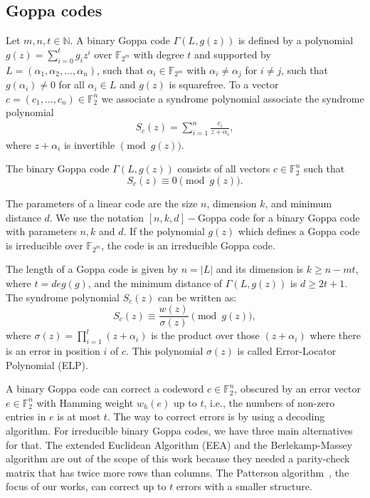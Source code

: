 \subsection{Goppa codes}
Let $m, n, t\in \mathbb{N}$. A binary Goppa code $\Gamma(L, g(z))$ is defined by a polynomial $g(z) = \sum_{i=0}^{t}g_iz^i$ over $\mathbb{F}_{2^m}$ with degree $t$ and supported by $L = (\alpha_1, \alpha_2, \dots, \alpha_n)$, such that $\alpha_i \in \mathbb{F}_{2^m}$ with $\alpha_i \neq \alpha_j$ for $i\neq j$, such that $g(\alpha_i) \neq 0$ for all $\alpha_i \in L$ and $g(z)$ is squarefree. To a vector  $c = (c_1, \ldots, c_{n}) \in \mathbb{F}^n_{2}$ we associate a syndrome polynomial associate the syndrome polynomial
\begin{align}
  S_c(z) = \sum_{i=1}^{n} \frac{c_i}{z+\alpha_i},  
\end{align}
where ${z+\alpha_i}$ is invertible $\pmod{g(z)}$.
\begin{definition}
The binary Goppa code $\Gamma(L, g(z))$ consists of all vectors $c \in \mathbb{F}_{2}^n$ such that
\begin{equation}
    S_c(z) \equiv 0 \pmod{g(z)}.
\end{equation}
\end{definition}

The parameters of a linear code are the size $n$, dimension $k$, and minimum distance $d$. We use the notation $[n,k,d]-$Goppa code for a binary Goppa code with parameters $n,k$ and $d$. If the polynomial $g(z)$ which defines a Goppa code is irreducible over $\mathbb{F}_{2^m}$, the code is an irreducible Goppa code.

The length of a Goppa code is given by $n = |L|$ and its dimension is $k \geq n-mt$, where $t = deg(g)$, and the minimum distance of $\Gamma(L, g(z))$ is $d \geq 2t + 1$. The syndrome polynomial $S_c(z)$ can be written as:
\begin{equation}
    S_c(z) \equiv \frac{w(z)}{\sigma(z)} \pmod{g(z)},
\end{equation}
where $\sigma(z) = {\displaystyle \prod_{i=1}^{l}(z+\alpha_i)}$ is the product over those $(z+\alpha_i)$ where there is an error in position $i$ of $c$. This polynomial $\sigma(z)$ is called Error-Locator Polynomial (ELP).

A binary Goppa code can correct a codeword $c \in \mathbb{F}_{2}^n$, obscured by an error vector $e \in \mathbb{F}_{2}^n$ with Hamming weight $w_h(e)$ up to $t$, i.e., the numbers of non-zero entries in $e$ is at most $t$. The way to correct errors is by using a decoding algorithm. For irreducible binary Goppa codes, we have three main alternatives for that. The extended Euclidean Algorithm (EEA) and the Berlekamp-Massey algorithm are out of the scope of this work because they needed a parity-check matrix that has twice more rows than columns. The Patterson algorithm~\cite{patterson1975algebraic}, the focus of our works, can correct up to $t$ errors with a smaller structure.

